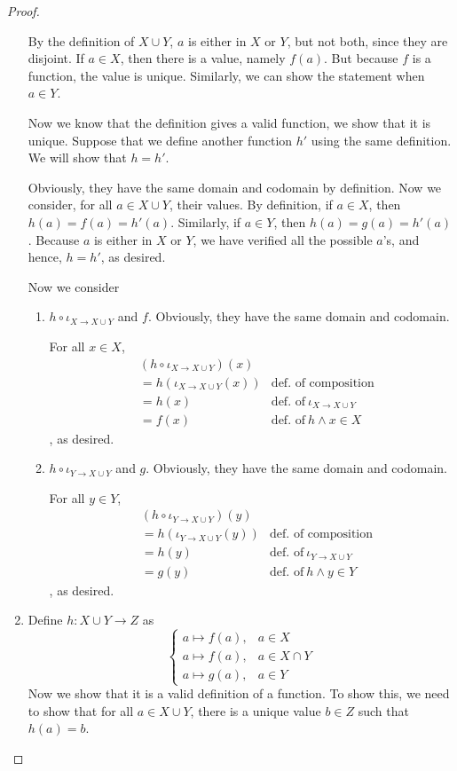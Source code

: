 \begin{proof}
\begin{enumerate}
		By the definition of $X \cup Y$, $a$ is either in $X$ or $Y$, but not both, since they are disjoint. If $a \in X$, then there is a value, namely $f(a)$. But because $f$ is a function, the value is unique. Similarly, we can show the statement when $a \in Y$.
		
		 Now we know that the definition gives a valid function, we show that it is unique. Suppose that we define another function $h'$ using the same definition. We will show that $h = h'$.
		
		Obviously, they have the same domain and codomain by definition. Now we consider, for all $a \in X \cup Y$, their values. By definition, if $a \in X$, then $h(a) = f(a) = h'(a)$. Similarly, if $a \in Y$, then $h(a) = g(a) = h'(a)$. Because $a$ is either in $X$ or $Y$, we have verified all the possible $a$'s, and hence, $h = h'$, as desired.
		
		 Now we consider
		\begin{enumerate}
			\item $h \circ \iota_{X \to X \cup Y}$ and $f$. Obviously, they have the same domain and codomain.
			
			For all $x \in X$, 
			\begin{align*}
				&(h \circ \iota_{X \to X \cup Y})(x) \\
				&= h(\iota_{X \to X \cup Y}(x)) 	&\text{def.~of composition}\\
				&= h(x) 							&\text{def.~of}\ \iota_{X \to X \cup Y}\\
				&= f(x)								&\text{def.~of}\ h \wedge x \in X
			\end{align*}
			, as desired.
			
			\item $h \circ \iota_{Y \to X \cup Y}$ and $g$. Obviously, they have the same domain and codomain.
			
			For all $y \in Y$, 
			\begin{align*}
				&(h \circ \iota_{Y \to X \cup Y})(y) \\
				&= h(\iota_{Y \to X \cup Y}(y)) 	&\text{def.~of composition}\\
				&= h(y) 							&\text{def.~of}\ \iota_{Y \to X \cup Y}\\
				&= g(y)								&\text{def.~of}\ h \wedge y \in Y
			\end{align*}
			, as desired.
		\end{enumerate}
		
		\item {} Define $h: X \cup Y \to Z$ as
		\[
		\begin{cases}
			a \mapsto f(a), &a \in X \\
			a \mapsto f(a), &a \in X \cap Y \\
			a \mapsto g(a), &a \in Y
		\end{cases}
		\]
		Now we show that it is a valid definition of a function. To show this, we need to show that for all $a \in X \cup Y$, there is a unique value $b \in Z$ such that $h(a) = b$.
		

\end{enumerate}
\end{proof}
